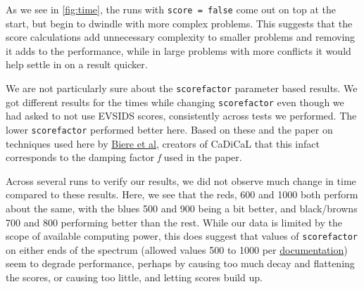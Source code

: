     As we see in \autoref{fig:time}, the runs with \texttt{score = false} come out on top at the start, but begin
    to dwindle with more complex problems. This suggests that the score calculations add 
    unnecessary complexity to smaller problems and removing it adds to the performance, while
    in large problems with more conflicts it would help settle in on a result quicker.

    We are not particularly sure about the \texttt{scorefactor} parameter based results. We got 
    different results for the times while changing \texttt{scorefactor} even though we had
    asked to not use EVSIDS scores, consistently across tests we performed. The lower \texttt{scorefactor}
    performed better here. Based on these and the paper on techniques used here by \href{http://fmv.jku.at/papers/BiereFroehlich-SAT15.pdf}{Biere et al},
    creators of CaDiCaL that this infact corresponds to the damping factor \emph{f} used in the paper.
    
    Across several runs to verify our results, we did not observe much change in time compared to these
    results. Here, we see that the reds, 600 and 1000 both perform about the same, with the blues 500 and 900 being a 
    bit better, and black/browns 700 and 800 performing better than the rest. While our data is limited by
    the scope of available computing power, this does suggest that values of \texttt{scorefactor} on either 
    ends of the spectrum (allowed values 500 to 1000 per \href{https://www.mankier.com/1/cadical}{documentation})
    seem to degrade performance, perhaps by causing too much decay and flattening the scores, or causing too little,
    and letting scores build up.

